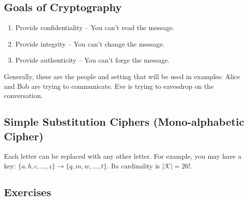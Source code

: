
\subsection{Goals of Cryptography}

\begin{enumerate}
    \item Provide confidentiality -- You can't read the message.
    \item Provide integrity -- You can't change the message.
    \item Provide authenticity -- You can't forge the message.
\end{enumerate}

Generally, these are the people and setting that will be used in examples: Alice and Bob are trying to communicate. Eve is trying to eavesdrop on the conversation. \\

\subsection{Simple Substitution Ciphers (Mono-alphabetic Cipher)}

Each letter can be replaced with any other letter. For example, you may have a key: \(\{a,b,c,\dots,z\} \rightarrow \{q,m,w,\dots,t\}\). Its cardinality is \(|\mathcal{K}| = 26!\). \\


\newpage



\renewcommand{\theenumi}{\alph{enumi}}
\renewcommand{\labelenumi}{(\theenumi)}
\subsection{Exercises}

